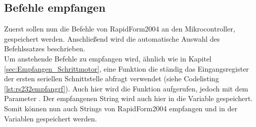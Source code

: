 \subsection{Befehle empfangen}
Zuerst sollen nun die Befehle von RapidForm2004 an den Mikrocontroller, gespeichert werden. Anschließend wird die automatische Auswahl des Befehlssatzes beschrieben.\\
Um anstehende Befehle zu empfangen wird, ähnlich wie in Kapitel \ref{sec:Empfangen_Schrittmotor}, eine Funktion die ständig das Eingangsregister der ersten seriellen Schnittstelle abfragt verwendet (siehe Codelisting \ref{lst:rs232empfangrf}). Auch hier wird die Funktion  aufgerufen, jedoch mit dem Parameter . Der empfangenen String wird auch hier in die Variable  gespeichert. Somit können nun auch Strings von RapidForm2004 empfangen und in der Variablen  gespeichert werden.
\lstset{language=Java, basicstyle=\footnotesize, showstringspaces=false, tabsize=8}


